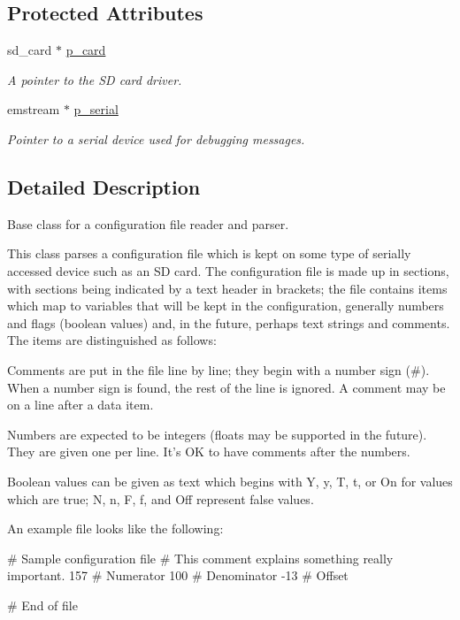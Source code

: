 \subsection*{Protected Attributes}
\begin{DoxyCompactItemize}
\item 
sd\-\_\-card $\ast$ \hyperlink{classconfig__file_a7f5e8d1a7a4b760531853d43857fc527}{p\-\_\-card}
\begin{DoxyCompactList}\small\item\em A pointer to the S\-D card driver. \end{DoxyCompactList}\item 
emstream $\ast$ \hyperlink{classconfig__file_a529cb0760d01190b93076cb9e7da4746}{p\-\_\-serial}
\begin{DoxyCompactList}\small\item\em Pointer to a serial device used for debugging messages. \end{DoxyCompactList}\end{DoxyCompactItemize}


\subsection{Detailed Description}
Base class for a configuration file reader and parser. 

This class parses a configuration file which is kept on some type of serially accessed device such as an S\-D card. The configuration file is made up in sections, with sections being indicated by a text header in brackets; the file contains items which map to variables that will be kept in the configuration, generally numbers and flags (boolean values) and, in the future, perhaps text strings and comments. The items are distinguished as follows\-: \begin{DoxyItemize}
\item Comments are put in the file line by line; they begin with a number sign ({\ttfamily \#}). When a number sign is found, the rest of the line is ignored. A comment may be on a line after a data item. \item Numbers are expected to be integers (floats may be supported in the future). They are given one per line. It's O\-K to have comments after the numbers. \item Boolean values can be given as text which begins with {\ttfamily Y}, {\ttfamily y}, {\ttfamily T}, {\ttfamily t}, or {\ttfamily On} for values which are true; {\ttfamily N}, {\ttfamily n}, {\ttfamily F}, {\ttfamily f}, and {\ttfamily Off} represent false values.\end{DoxyItemize}
An example file looks like the following\-: 
\begin{DoxyCode}
\textcolor{preprocessor}{# Sample configuration file}
\textcolor{preprocessor}{}\textcolor{preprocessor}{# This comment explains something really important.}
\textcolor{preprocessor}{}157            # Numerator
100            # Denominator
-13            # Offset

\textcolor{preprocessor}{# End of file}
\end{DoxyCode}
 

